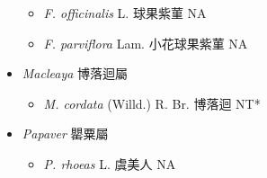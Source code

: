 \begin{itemize}
  \begin{itemize}
        \item[] \textit{F. officinalis} L.  球果紫菫   NA
        \item[] \textit{F. parviflora} Lam.  小花球果紫菫   NA
  \end{itemize}
 \item[] \textit{Macleaya} 博落迴屬
                                
  \begin{itemize}
        \item[] \textit{M. cordata} (Willd.) R. Br.  博落迴   NT*
  \end{itemize}
 \item[] \textit{Papaver} 罌粟屬
                                
  \begin{itemize}
        \item[] \textit{P. rhoeas} L.  虞美人   NA
  \end{itemize}
  \end{itemize}
